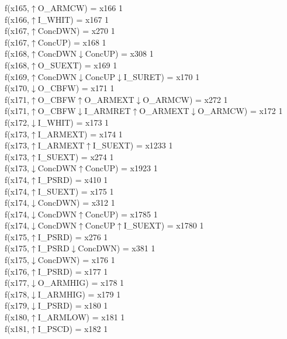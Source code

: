 f(x165,$\uparrow$O\_ARMCW) = x166 {1} \\
f(x166,$\uparrow$I\_WHIT) = x167 {1} \\
f(x167,$\uparrow$ConcDWN) = x270 {1} \\
f(x167,$\uparrow$ConcUP) = x168 {1} \\
f(x168,$\uparrow$ConcDWN$\downarrow$ConcUP) = x308 {1} \\
f(x168,$\uparrow$O\_SUEXT) = x169 {1} \\
f(x169,$\uparrow$ConcDWN$\downarrow$ConcUP$\downarrow$I\_SURET) = x170 {1} \\
f(x170,$\downarrow$O\_CBFW) = x171 {1} \\
f(x171,$\uparrow$O\_CBFW$\uparrow$O\_ARMEXT$\downarrow$O\_ARMCW) = x272 {1} \\
f(x171,$\uparrow$O\_CBFW$\downarrow$I\_ARMRET$\uparrow$O\_ARMEXT$\downarrow$O\_ARMCW) = x172 {1} \\
f(x172,$\downarrow$I\_WHIT) = x173 {1} \\
f(x173,$\uparrow$I\_ARMEXT) = x174 {1} \\
f(x173,$\uparrow$I\_ARMEXT$\uparrow$I\_SUEXT) = x1233 {1} \\
f(x173,$\uparrow$I\_SUEXT) = x274 {1} \\
f(x173,$\downarrow$ConcDWN$\uparrow$ConcUP) = x1923 {1} \\
f(x174,$\uparrow$I\_PSRD) = x410 {1} \\
f(x174,$\uparrow$I\_SUEXT) = x175 {1} \\
f(x174,$\downarrow$ConcDWN) = x312 {1} \\
f(x174,$\downarrow$ConcDWN$\uparrow$ConcUP) = x1785 {1} \\
f(x174,$\downarrow$ConcDWN$\uparrow$ConcUP$\uparrow$I\_SUEXT) = x1780 {1} \\
f(x175,$\uparrow$I\_PSRD) = x276 {1} \\
f(x175,$\uparrow$I\_PSRD$\downarrow$ConcDWN) = x381 {1} \\
f(x175,$\downarrow$ConcDWN) = x176 {1} \\
f(x176,$\uparrow$I\_PSRD) = x177 {1} \\
f(x177,$\downarrow$O\_ARMHIG) = x178 {1} \\
f(x178,$\downarrow$I\_ARMHIG) = x179 {1} \\
f(x179,$\downarrow$I\_PSRD) = x180 {1} \\
f(x180,$\uparrow$I\_ARMLOW) = x181 {1} \\
f(x181,$\uparrow$I\_PSCD) = x182 {1} \\
